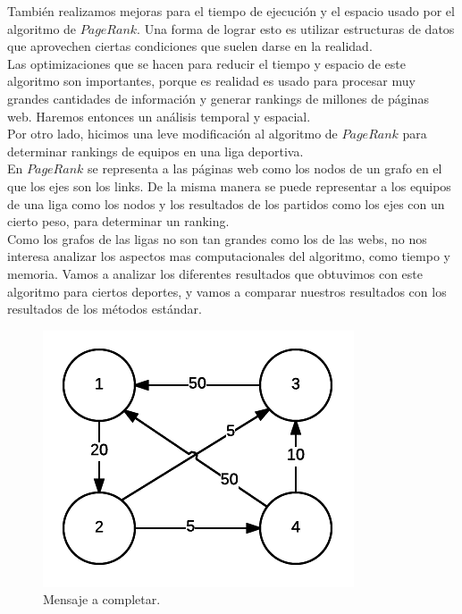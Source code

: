 También realizamos mejoras para el tiempo de ejecución y el espacio usado por el algoritmo de $PageRank$. Una forma de lograr esto es utilizar estructuras de datos que aprovechen ciertas condiciones que suelen darse en la realidad.\\

 Las optimizaciones que se hacen para reducir el tiempo y espacio de este algoritmo son importantes, porque es realidad es usado para procesar muy grandes cantidades de información y generar rankings de millones de páginas web. Haremos entonces un análisis temporal y espacial.\\

Por otro lado, hicimos una leve modificación al algoritmo de $PageRank$ para determinar rankings de equipos en una liga deportiva. \\

En $PageRank$ se representa a las páginas web como los nodos de un grafo en el que los ejes son los links. De la misma manera se puede representar a los equipos de una liga como los nodos y los resultados de los partidos como los ejes con un cierto peso, para determinar un ranking.\\

Como los grafos de las ligas no son tan grandes como los de las webs, no nos interesa analizar los aspectos mas computacionales del algoritmo, como tiempo y memoria. Vamos a analizar los diferentes resultados que obtuvimos con este algoritmo para ciertos deportes, y vamos a comparar nuestros resultados con los resultados de los métodos estándar.\\


\begin{figure}
  \vspace{-20pt}
  \begin{center}
    \includegraphics[scale= 0.8]{imagenes/grafo4equipos.png}
  \end{center}
  \vspace{-20pt}
  \caption{Mensaje a completar.}
  \vspace{-10pt}
  \label{fig:img2}
\end{figure}



